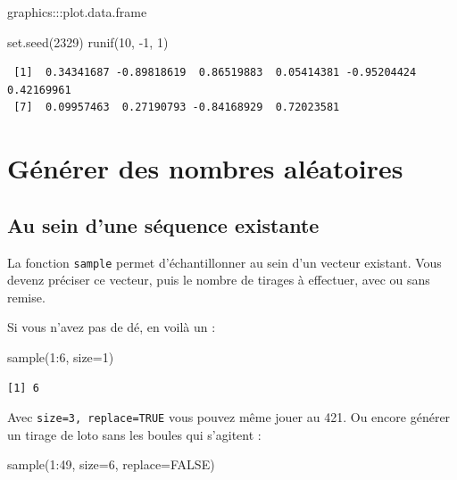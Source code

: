 \documentclass[
  letterpaper,
  DIV=11,
  numbers=noendperiod]{scrreprt}
\newenvironment{Shaded}{\begin{snugshade}}{\end{snugshade}}
\newcommand{\AttributeTok}[1]{\textcolor[rgb]{0.40,0.45,0.13}{#1}}
\newcommand{\ConstantTok}[1]{\textcolor[rgb]{0.56,0.35,0.01}{#1}}
\newcommand{\DecValTok}[1]{\textcolor[rgb]{0.68,0.00,0.00}{#1}}
\newcommand{\FunctionTok}[1]{\textcolor[rgb]{0.28,0.35,0.67}{#1}}
\newcommand{\NormalTok}[1]{\textcolor[rgb]{0.00,0.23,0.31}{#1}}
\newcommand{\SpecialCharTok}[1]{\textcolor[rgb]{0.37,0.37,0.37}{#1}}
\begin{document}
graphics:::plot.data.frame

\begin{Shaded}
\begin{Highlighting}[]
\FunctionTok{set.seed}\NormalTok{(}\DecValTok{2329}\NormalTok{)}
\FunctionTok{runif}\NormalTok{(}\DecValTok{10}\NormalTok{, }\SpecialCharTok{{-}}\DecValTok{1}\NormalTok{, }\DecValTok{1}\NormalTok{)}
\end{Highlighting}
\end{Shaded}

\begin{verbatim}
 [1]  0.34341687 -0.89818619  0.86519883  0.05414381 -0.95204424  0.42169961
 [7]  0.09957463  0.27190793 -0.84168929  0.72023581
\end{verbatim}

\hypertarget{guxe9nuxe9rer-des-nombres-aluxe9atoires}{%
\section{Générer des nombres
aléatoires}\label{guxe9nuxe9rer-des-nombres-aluxe9atoires}}

\hypertarget{au-sein-dune-suxe9quence-existante}{%
\subsection{Au sein d'une séquence
existante}\label{au-sein-dune-suxe9quence-existante}}

La fonction \texttt{sample} permet d'échantillonner au sein d'un vecteur
existant. Vous devenz préciser ce vecteur, puis le nombre de tirages à
effectuer, avec ou sans remise.

Si vous n'avez pas de dé, en voilà un :

\begin{Shaded}
\begin{Highlighting}[]
\FunctionTok{sample}\NormalTok{(}\DecValTok{1}\SpecialCharTok{:}\DecValTok{6}\NormalTok{, }\AttributeTok{size=}\DecValTok{1}\NormalTok{)}
\end{Highlighting}
\end{Shaded}

\begin{verbatim}
[1] 6
\end{verbatim}

Avec \texttt{size=3,\ replace=TRUE} vous pouvez même jouer au 421. Ou
encore générer un tirage de loto sans les boules qui s'agitent :

\begin{Shaded}
\begin{Highlighting}[]
\FunctionTok{sample}\NormalTok{(}\DecValTok{1}\SpecialCharTok{:}\DecValTok{49}\NormalTok{, }\AttributeTok{size=}\DecValTok{6}\NormalTok{, }\AttributeTok{replace=}\ConstantTok{FALSE}\NormalTok{)}
\end{Highlighting}
\end{Shaded}
\end{document}
